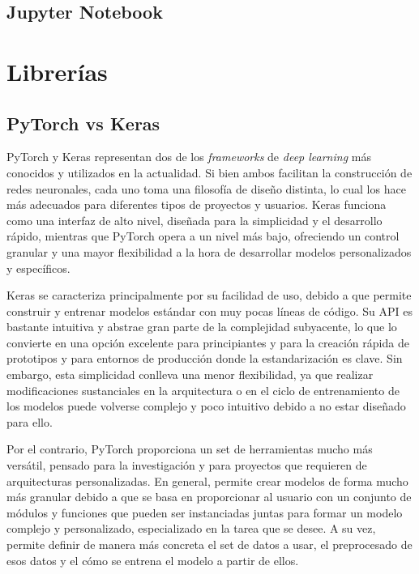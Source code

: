 \subsection{Jupyter Notebook}

\section{Librerías}

\subsection{PyTorch vs Keras}

PyTorch y Keras representan dos de los \textit{frameworks} de \textit{deep learning} más conocidos y utilizados en la actualidad. Si bien ambos facilitan la construcción de redes neuronales, cada uno toma una filosofía de diseño distinta, lo cual los hace más adecuados para diferentes tipos de proyectos y usuarios. Keras funciona como una interfaz de alto nivel, diseñada para la simplicidad y el desarrollo rápido, mientras que PyTorch opera a un nivel más bajo, ofreciendo un control granular y una mayor flexibilidad a la hora de desarrollar modelos personalizados y específicos.

Keras se caracteriza principalmente por su facilidad de uso, debido a que permite construir y entrenar modelos estándar con muy pocas líneas de código. Su API es bastante intuitiva y abstrae gran parte de la complejidad subyacente, lo que lo convierte en una opción excelente para principiantes y para la creación rápida de prototipos y para entornos de producción donde la estandarización es clave. Sin embargo, esta simplicidad conlleva una menor flexibilidad, ya que realizar modificaciones sustanciales en la arquitectura o en el ciclo de entrenamiento de los modelos puede volverse complejo y poco intuitivo debido a no estar diseñado para ello.

Por el contrario, PyTorch proporciona un set de herramientas mucho más versátil, pensado para la investigación y para proyectos que requieren de arquitecturas personalizadas. En general, permite crear modelos de forma mucho más granular debido a que se basa en proporcionar al usuario con un conjunto de módulos y funciones que pueden ser instanciadas juntas para formar un modelo complejo y personalizado, especializado en la tarea que se desee. A su vez, permite definir de manera más concreta el set de datos a usar, el preprocesado de esos datos y el cómo se entrena el modelo a partir de ellos.

